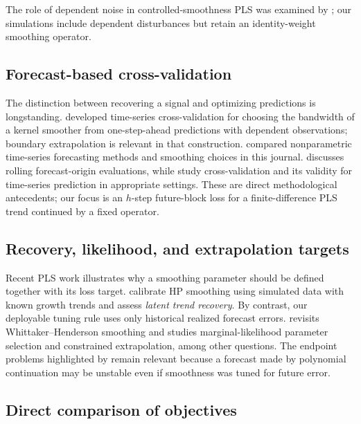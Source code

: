 The role of dependent noise in controlled-smoothness PLS
was examined by \citet{guerrero2018autocorr}; our
simulations include dependent disturbances but retain
an identity-weight smoothing operator.

\subsection{Forecast-based cross-validation}

The distinction between recovering a signal
and optimizing predictions is longstanding.
\citet{hart1994tscv} developed time-series
cross-validation for choosing the bandwidth
of a kernel smoother from one-step-ahead
predictions with dependent observations;
boundary extrapolation is relevant in
that construction. \citet{vilar2007nonparametric}
compared nonparametric time-series forecasting
methods and smoothing choices in this journal.
\citet{tashman2000oos} discusses rolling
forecast-origin evaluations, while
\citet{bergmeir2012cv,bergmeir2018validity}
study cross-validation and its validity
for time-series prediction in appropriate
settings. These are direct methodological
antecedents; our focus is an $h$-step
future-block loss for a finite-difference
PLS trend continued by a fixed operator.

\subsection{Recovery, likelihood, and extrapolation targets}

Recent PLS work illustrates why a smoothing
parameter should be defined together with
its loss target. \citet{franke2026hp}
calibrate HP smoothing using simulated
data with known growth trends and assess
\emph{latent trend recovery}. By contrast,
our deployable tuning rule uses only
historical realized forecast errors.
\citet{biessy2026whittaker} revisits
Whittaker--Henderson smoothing and studies
marginal-likelihood parameter selection
and constrained extrapolation, among
other questions. The endpoint problems
highlighted by \citet{hamilton2018hp}
remain relevant because a forecast
made by polynomial continuation may be
unstable even if smoothness was tuned
for future error.

\subsection{Direct comparison of objectives}

